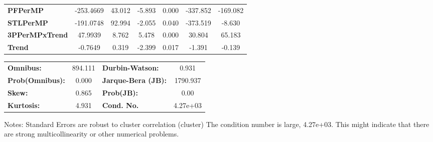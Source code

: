 \begin{center}
\begin{tabular}{lcccccc}
\textbf{PFPerMP}       &    -253.4669  &       43.012     &    -5.893  &         0.000        &     -337.852    &     -169.082     \\
\textbf{STLPerMP}      &    -191.0748  &       92.994     &    -2.055  &         0.040        &     -373.519    &       -8.630     \\
\textbf{3PPerMPxTrend} &      47.9939  &        8.762     &     5.478  &         0.000        &       30.804    &       65.183     \\
\textbf{Trend}         &      -0.7649  &        0.319     &    -2.399  &         0.017        &       -1.391    &       -0.139     \\
\bottomrule
\end{tabular}
\begin{tabular}{lclc}
\textbf{Omnibus:}       & 894.111 & \textbf{  Durbin-Watson:     } &    0.931  \\
\textbf{Prob(Omnibus):} &   0.000 & \textbf{  Jarque-Bera (JB):  } & 1790.937  \\
\textbf{Skew:}          &   0.865 & \textbf{  Prob(JB):          } &     0.00  \\
\textbf{Kurtosis:}      &   4.931 & \textbf{  Cond. No.          } & 4.27e+03  \\
\bottomrule
\end{tabular}
\end{center}

Notes: \newline
 [1] Standard Errors are robust to cluster correlation (cluster) \newline
 [2] The condition number is large, 4.27e+03. This might indicate that there are \newline
 strong multicollinearity or other numerical problems.